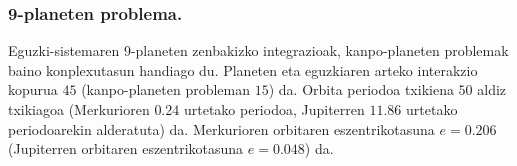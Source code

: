 \begin{table}[h]
\caption[Kanpoko planeten problema.]{Kanpo-planeten problemaren hasierako balioak, kokapenak ($x,y,z$) eta abiadurak ($v_x,v_y,v_z$).}
\label{tab:oss0}       %
\centering
{}
\end{table}


\subsubsection*{9-planeten problema.}


Eguzki-sistemaren 9-planeten zenbakizko integrazioak, kanpo-planeten problemak baino konplexutasun handiago du. Planeten eta eguzkiaren arteko interakzio kopurua $45$ (kanpo-planeten probleman $15$) da. Orbita periodoa txikiena  $50$ aldiz txikiagoa (Merkurioren $0.24$ urtetako periodoa, Jupiterren $11.86$ urtetako periodoarekin alderatuta) da. Merkurioren orbitaren eszentrikotasuna $e=0.206$ (Jupiterren orbitaren eszentrikotasuna $e=0.048$) da. 

